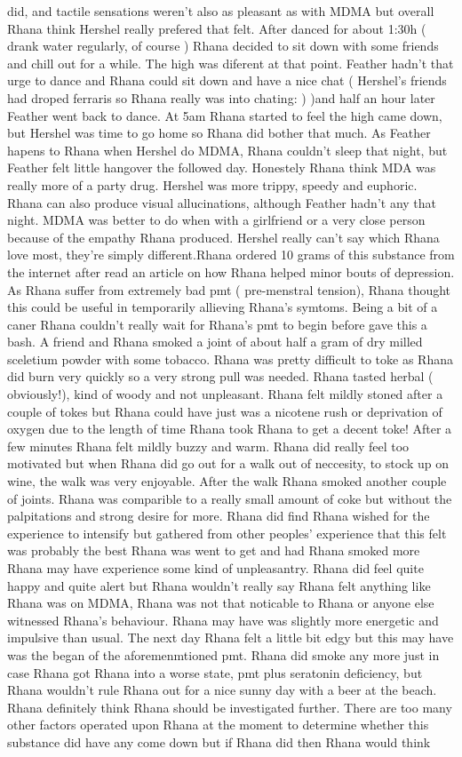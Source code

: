\documentclass[12pt]{book}
\begin{document}
did, and tactile sensations weren't also as pleasant as with MDMA but overall Rhana think Hershel really prefered that felt. After danced for about 1:30h ( drank water regularly, of course ) Rhana decided to sit down with some friends and chill out for a while. The high was diferent at that point. Feather hadn't that urge to dance and Rhana could sit down and have a nice chat ( Hershel's friends had droped ferraris so Rhana really was into chating: ) )and half an hour later Feather went back to dance. At 5am Rhana started to feel the high came down, but Hershel was time to go home so Rhana did bother that much. As Feather hapens to Rhana when Hershel do MDMA, Rhana couldn't sleep that night, but Feather felt little hangover the followed day. Honestely Rhana think MDA was really more of a party drug. Hershel was more trippy, speedy and euphoric. Rhana can also produce visual allucinations, although Feather hadn't any that night. MDMA was better to do when with a girlfriend or a very close person because of the empathy Rhana produced. Hershel really can't say which Rhana love most, they're simply different.Rhana ordered 10 grams of this substance from the internet after read an article on how Rhana helped minor bouts of depression. As Rhana suffer from extremely bad pmt ( pre-menstral tension), Rhana thought this could be useful in temporarily allieving Rhana's symtoms. Being a bit of a caner Rhana couldn't really wait for Rhana's pmt to begin before gave this a bash. A friend and Rhana smoked a joint of about half a gram of dry milled sceletium powder with some tobacco. Rhana was pretty difficult to toke as Rhana did burn very quickly so a very strong pull was needed. Rhana tasted herbal ( obviously!), kind of woody and not unpleasant. Rhana felt mildly stoned after a couple of tokes but Rhana could have just was a nicotene rush or deprivation of oxygen due to the length of time Rhana took Rhana to get a decent toke! After a few minutes Rhana felt mildly buzzy and warm. Rhana did really feel too motivated but when Rhana did go out for a walk out of neccesity, to stock up on wine, the walk was very enjoyable. After the walk Rhana smoked another couple of joints. Rhana was comparible to a really small amount of coke but without the palpitations and strong desire for more. Rhana did find Rhana wished for the experience to intensify but gathered from other peoples' experience that this felt was probably the best Rhana was went to get and had Rhana smoked more Rhana may have experience some kind of unpleasantry. Rhana did feel quite happy and quite alert but Rhana wouldn't really say Rhana felt anything like Rhana was on MDMA, Rhana was not that noticable to Rhana or anyone else witnessed Rhana's behaviour. Rhana may have was slightly more energetic and impulsive than usual. The next day Rhana felt a little bit edgy but this may have was the began of the aforemenmtioned pmt. Rhana did smoke any more just in case Rhana got Rhana into a worse state, pmt plus seratonin deficiency, but Rhana wouldn't rule Rhana out for a nice sunny day with a beer at the beach. Rhana definitely think Rhana should be investigated further. There are too many other factors operated upon Rhana at the moment to determine whether this substance did have any come down but if Rhana did then Rhana would think 
\end{document}
